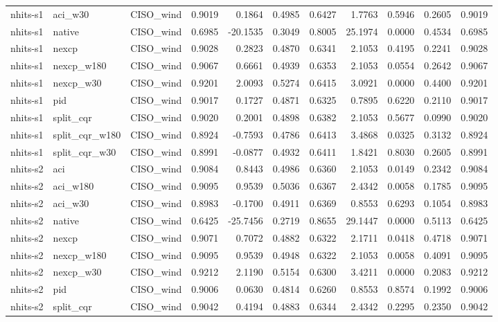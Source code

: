\begin{tabular}{lllrrrrrrrr}
nhits-s1 & aci_w30 & CISO_wind & 0.9019 & 0.1864 & 0.4985 & 0.6427 & 1.7763 & 0.5946 & 0.2605 & 0.9019 \\
nhits-s1 & native & CISO_wind & 0.6985 & -20.1535 & 0.3049 & 0.8005 & 25.1974 & 0.0000 & 0.4534 & 0.6985 \\
nhits-s1 & nexcp & CISO_wind & 0.9028 & 0.2823 & 0.4870 & 0.6341 & 2.1053 & 0.4195 & 0.2241 & 0.9028 \\
nhits-s1 & nexcp_w180 & CISO_wind & 0.9067 & 0.6661 & 0.4939 & 0.6353 & 2.1053 & 0.0554 & 0.2642 & 0.9067 \\
nhits-s1 & nexcp_w30 & CISO_wind & 0.9201 & 2.0093 & 0.5274 & 0.6415 & 3.0921 & 0.0000 & 0.4400 & 0.9201 \\
nhits-s1 & pid & CISO_wind & 0.9017 & 0.1727 & 0.4871 & 0.6325 & 0.7895 & 0.6220 & 0.2110 & 0.9017 \\
nhits-s1 & split_cqr & CISO_wind & 0.9020 & 0.2001 & 0.4898 & 0.6382 & 2.1053 & 0.5677 & 0.0990 & 0.9020 \\
nhits-s1 & split_cqr_w180 & CISO_wind & 0.8924 & -0.7593 & 0.4786 & 0.6413 & 3.4868 & 0.0325 & 0.3132 & 0.8924 \\
nhits-s1 & split_cqr_w30 & CISO_wind & 0.8991 & -0.0877 & 0.4932 & 0.6411 & 1.8421 & 0.8030 & 0.2605 & 0.8991 \\
nhits-s2 & aci & CISO_wind & 0.9084 & 0.8443 & 0.4986 & 0.6360 & 2.1053 & 0.0149 & 0.2342 & 0.9084 \\
nhits-s2 & aci_w180 & CISO_wind & 0.9095 & 0.9539 & 0.5036 & 0.6367 & 2.4342 & 0.0058 & 0.1785 & 0.9095 \\
nhits-s2 & aci_w30 & CISO_wind & 0.8983 & -0.1700 & 0.4911 & 0.6369 & 0.8553 & 0.6293 & 0.1054 & 0.8983 \\
nhits-s2 & native & CISO_wind & 0.6425 & -25.7456 & 0.2719 & 0.8655 & 29.1447 & 0.0000 & 0.5113 & 0.6425 \\
nhits-s2 & nexcp & CISO_wind & 0.9071 & 0.7072 & 0.4882 & 0.6322 & 2.1711 & 0.0418 & 0.4718 & 0.9071 \\
nhits-s2 & nexcp_w180 & CISO_wind & 0.9095 & 0.9539 & 0.4948 & 0.6322 & 2.1053 & 0.0058 & 0.4091 & 0.9095 \\
nhits-s2 & nexcp_w30 & CISO_wind & 0.9212 & 2.1190 & 0.5154 & 0.6300 & 3.4211 & 0.0000 & 0.2083 & 0.9212 \\
nhits-s2 & pid & CISO_wind & 0.9006 & 0.0630 & 0.4814 & 0.6260 & 0.8553 & 0.8574 & 0.1992 & 0.9006 \\
nhits-s2 & split_cqr & CISO_wind & 0.9042 & 0.4194 & 0.4883 & 0.6344 & 2.4342 & 0.2295 & 0.2350 & 0.9042 \\

\end{tabular}
